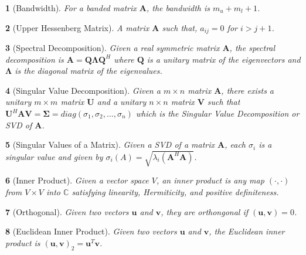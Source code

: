 \documentclass{article}
\theoremstyle{bolddef}
\newtheorem*{definition}{}
\begin{document}
\begin{definition}[Bandwidth]
    For a banded matrix $\mathbf{A}$, the bandwidth is $m_u + m_l + 1$.
\end{definition}

\begin{definition}[Upper Hessenberg Matrix]
    A matrix $\mathbf{A}$ such that, $a_{ij} = 0$ for $i > j + 1$.
\end{definition}

\begin{definition}[Spectral Decomposition]
    Given a real symmetric matrix $\mathbf{A}$, the spectral decomposition is $\mathbf{A} = \mathbf{Q}\mathbf{\Lambda }\mathbf{Q}^{H}$ where $\mathbf{Q}$ is a unitary
    matrix of the eigenvectors and $\mathbf{\Lambda}$ is the diagonal matrix of the eigenvalues.
\end{definition}

\begin{definition}[Singular Value Decomposition]
    Given a  $m \times n$ matrix $\mathbf{A}$, there exists a unitary $m \times m$ matrix $\mathbf{U}$ and 
    a unitary $n \times n$ matrix $\mathbf{V}$ such that $\mathbf{U}^{H}\mathbf{A}\mathbf{V} = \mathbf{\Sigma} = diag(\sigma_1, \sigma_2, \ldots, \sigma_n)$
    which is the Singular Value Decomposition or SVD of $\mathbf{A}$.
\end{definition}

\begin{definition}[Singular Values of a Matrix]
    Given a SVD of a matrix $\mathbf{A}$, each $\sigma_i$ is a singular value and given
    by $\sigma_i(A) = \sqrt{\lambda_i (\mathbf{A}^{H}\mathbf{A})}$.
\end{definition}

\begin{definition}[Inner Product]
    Given a vector space $\mathit{V}$, an inner product is any map $(\cdot, \cdot)$
    from $\mathit{V}\times \mathit{V}$ into $\mathbb{C}$ satisfying 
    linearity, Hermiticity, and positive definiteness.
\end{definition}

\begin{definition}[Orthogonal]
    Given two vectors $\mathbf{u}$ and $\mathbf{v}$, they are orthongonal if $(\mathbf{u}, \mathbf{v})=0$.
\end{definition}

\begin{definition}[Euclidean Inner Product]
    Given two vectors $\mathbf{u}$ and $\mathbf{v}$, the Euclidean inner product is 
    ${(\mathbf{u}, \mathbf{v})}_2= \mathbf{u}^{T}\mathbf{v}$.
\end{definition}
\end{document}
